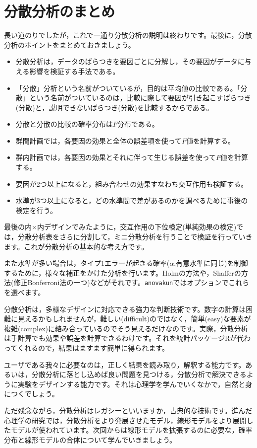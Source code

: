 \documentclass{ltjbook}
\begin{document}
\section{分散分析のまとめ}
長い道のりでしたが，これで一通り分散分析の説明は終わりです。最後に，分散分析のポイントをまとめておきましょう。
\begin{itemize}
  \item 分散分析は，データのばらつきを要因ごとに分解し，その要因がデータに与える影響を検証する手法である。
  \item 「分散」分析という名前がついているが，目的は平均値の比較である。「分散」という名前がついているのは，比較に際して要因が引き起こすばらつき(分散)と，説明できないばらつき(分散)を比較するからである。
  \item 分散と分散の比較の確率分布は$F$分布である。
  \item 群間計画では，各要因の効果と全体の誤差項を使って$F$値を計算する。
  \item 群内計画では，各要因の効果とそれに伴って生じる誤差を使って$F$値を計算する。
  \item 要因が2つ以上になると，組み合わせの効果すなわち交互作用も検証する。
  \item 水準が3つ以上になると，どの水準間で差があるのかを調べるために事後の検定を行う。
\end{itemize}

最後の内$\times$内デザインでみたように，交互作用の下位検定(単純効果の検定)では，分散分析表をさらに分割して，ミニ分散分析を行うことで検証を行っていきます。これが分散分析の基本的な考え方です。

また水準が多い場合は，タイプ1エラーが起きる確率($\alpha$,有意水準に同じ)を制御するために，様々な補正をかけた分析を行います。Holmの方法や，Shafferの方法(修正Bonferroni法の一つ)などがそれです。\verb|anovakun|ではオプションでこれらを選べます。

分散分析は，多様なデザインに対応できる強力な判断技術です。数字の計算は困難に見えるかもしれませんが，難しい(difficult)のではなく，簡単(easy)な要素が複雑(complex)に絡み合っているのでそう見えるだけなのです。実際，分散分析は手計算でも効果や誤差を計算できるわけです。それを統計パッケージRが代わってくれるので，結果はますます簡単に得られます。

ユーザである我々に必要なのは，正しく結果を読み取り，解釈する能力です。あるいは，分散分析に落とし込めば良い問題を見つける，分散分析で解決できるように実験をデザインする能力です。それは心理学を学んでいくなかで，自然と身につくでしょう。

ただ残念ながら，分散分析はレガシーといいますか，古典的な技術です。進んだ心理学の研究では，分散分析をより発展させたモデル，線形モデルをより展開したモデルが使われています。次回からは線形モデルを拡張するのに必要な，確率分布と線形モデルの合体について学んでいきましょう。
\end{document}
